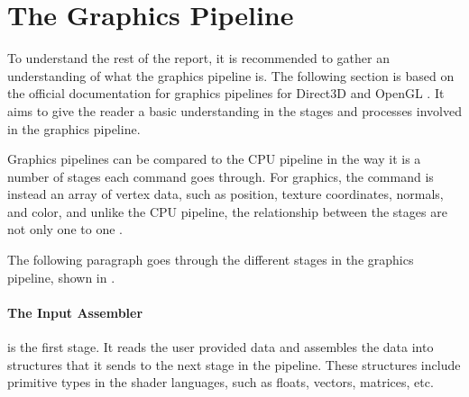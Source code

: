 \section{The Graphics Pipeline} \label{sec:pipeline} 
\begin{sectionmeta}
To understand the rest of the report, it is recommended to gather an understanding of what the graphics pipeline is.
The following section is based on the official documentation for graphics pipelines for Direct3D and OpenGL \cite{khronos????pipeline, microsoft????pipeline}.
It aims to give the reader a basic understanding in the stages and processes involved in the graphics pipeline.
\end{sectionmeta}

Graphics pipelines can be compared to the \gls{CPU} pipeline in the way it is a number of stages each command goes through.
For graphics, the command is instead an array of vertex data, such as position, texture coordinates, normals, and color, and unlike the \gls{CPU} pipeline, the relationship between the stages are not only one to one .


The following paragraph goes through the different stages in the graphics pipeline, shown in .

\paragraph{The Input Assembler} is the first stage. 
It reads the user provided data and assembles the data into structures that it sends to the next stage in the pipeline. 
These structures include primitive types in the shader languages, such as floats, vectors, matrices, etc.

